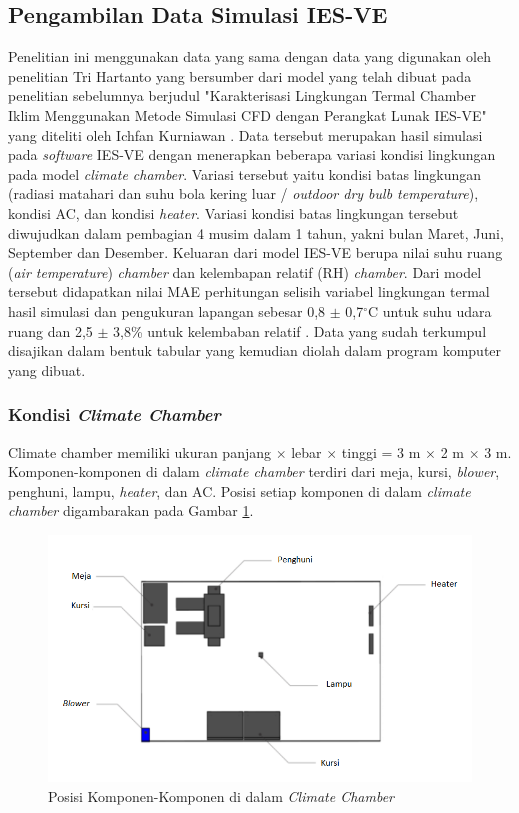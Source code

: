 \subsection{Pengambilan Data Simulasi IES-VE}
Penelitian ini menggunakan data yang sama dengan data yang digunakan oleh penelitian Tri Hartanto\cite{skripsiTanto} yang bersumber dari model yang telah dibuat pada penelitian sebelumnya berjudul "Karakterisasi Lingkungan Termal Chamber Iklim Menggunakan Metode Simulasi CFD dengan Perangkat Lunak IES-VE" yang diteliti oleh Ichfan Kurniawan \cite{skripsiIchfan}.  Data tersebut merupakan hasil simulasi pada \textit{software} IES-VE dengan menerapkan beberapa variasi kondisi lingkungan pada model \textit{climate chamber}. Variasi tersebut yaitu kondisi batas lingkungan (radiasi matahari dan suhu bola kering luar / \textit{outdoor dry bulb temperature}), kondisi AC, dan kondisi \textit{heater}. Variasi kondisi batas lingkungan tersebut diwujudkan dalam pembagian 4 musim dalam 1 tahun, yakni bulan Maret, Juni, September dan Desember. Keluaran dari model IES-VE berupa nilai suhu ruang (\textit{air temperature}) \textit{chamber} dan kelembapan relatif (RH) \textit{chamber}. Dari model tersebut didapatkan nilai MAE perhitungan selisih variabel lingkungan termal hasil simulasi dan pengukuran lapangan sebesar 0,8 $\pm$ 0,7$^{\circ}$C untuk suhu udara ruang dan 2,5 $\pm$ 3,8\% untuk kelembaban relatif \cite{skripsiIchfan}. Data yang sudah terkumpul disajikan dalam bentuk tabular yang kemudian diolah dalam program komputer yang dibuat.

\subsubsection{Kondisi \textit{Climate Chamber}}

Climate chamber memiliki ukuran panjang $\times$ lebar $\times$ tinggi = 3 m $\times$ 2 m $\times$ 3 m. Komponen-komponen di dalam \textit{climate chamber} terdiri dari meja, kursi, \textit{blower}, penghuni, lampu, \textit{heater}, dan AC. Posisi setiap komponen di dalam \textit{climate chamber} digambarakan pada Gambar \ref{fig:4:KondisiChamber}.

\begin{figure}[!h]
	\centering
	\includegraphics[width=1\textwidth]{figures/KondisiChamber}
	\caption{Posisi Komponen-Komponen di dalam \textit{Climate Chamber}}
	\label{fig:4:KondisiChamber}
\end{figure}

